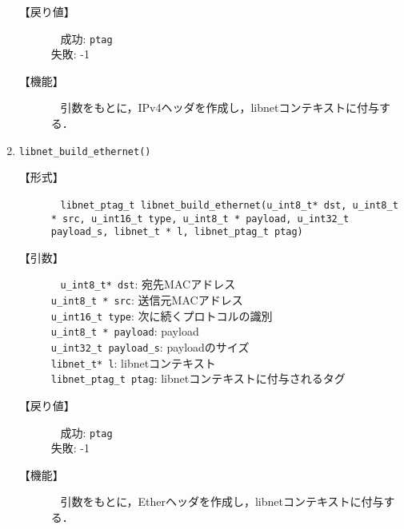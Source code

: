 \documentclass[12pt]{jsarticle}
\begin{document}
\begin{enumerate}
\begin{description}
            \item[【戻り値】]~\newline
                成功: {\tt ptag}\\
                失敗: -1\\
            \item[【機能】]~\newline
                引数をもとに，IPv4ヘッダを作成し，libnetコンテキストに付与する．
        \end{description}
    \item {\tt libnet\_build\_ethernet()}
        \begin{description}
            \item[【形式】]~\newline
                {\tt libnet\_ptag\_t libnet\_build\_ethernet(u\_int8\_t* dst, u\_int8\_t * src, u\_int16\_t type, u\_int8\_t * payload, u\_int32\_t payload\_s, libnet\_t * l, libnet\_ptag\_t ptag)}
            \item[【引数】]~\newline
                {\tt u\_int8\_t* dst}: 宛先MACアドレス\\
                {\tt u\_int8\_t * src}: 送信元MACアドレス\\
                {\tt u\_int16\_t type}: 次に続くプロトコルの識別\\
                {\tt u\_int8\_t * payload}: payload\\
                {\tt u\_int32\_t payload\_s}: payloadのサイズ\\
                {\tt libnet\_t* l}: libnetコンテキスト\\
                {\tt libnet\_ptag\_t ptag}: libnetコンテキストに付与されるタグ\\

            \item[【戻り値】]~\newline
                成功: {\tt ptag}\\
                失敗: -1\\
            \item[【機能】]~\newline
                引数をもとに，Etherヘッダを作成し，libnetコンテキストに付与する．
        \end{description}
\end{enumerate}
\end{document}
